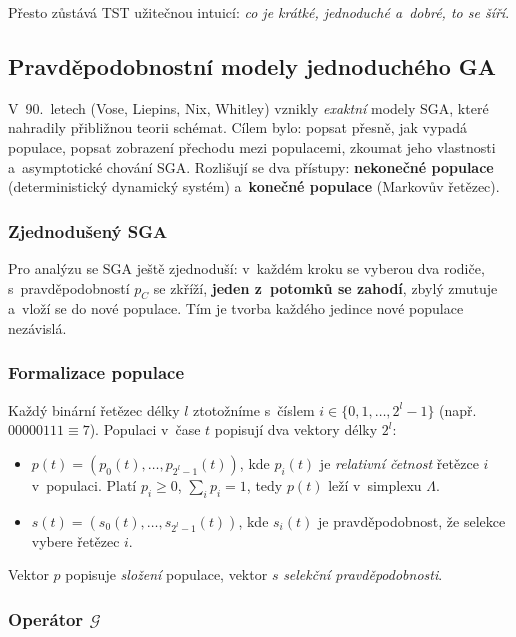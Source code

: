 \documentclass[11pt,a4paper]{article}
\theoremstyle{definition}
\begin{document}
Přesto zůstává TST užitečnou intuicí: \emph{co je krátké, jednoduché a~dobré,
to se šíří}.

\subsection{Pravděpodobnostní modely jednoduchého GA}
\label{sec:vose}


V~90.\ letech (Vose, Liepins, Nix, Whitley) vznikly \emph{exaktní} modely SGA,
které nahradily přibližnou teorii schémat. Cílem bylo:
popsat přesně, jak vypadá populace, popsat zobrazení přechodu mezi populacemi,
zkoumat jeho vlastnosti a~asymptotické chování SGA. Rozlišují se dva přístupy:
\textbf{nekonečné populace} (deterministický dynamický systém) a~\textbf{konečné
populace} (Markovův řetězec).

\subsubsection{Zjednodušený SGA}

Pro analýzu se SGA ještě zjednoduší: v~každém kroku se vyberou dva rodiče,
s~pravděpodobností $p_C$ se zkříží, \textbf{jeden z~potomků se zahodí},
zbylý zmutuje a~vloží se do nové populace. Tím je tvorba každého jedince
nové populace nezávislá.

\subsubsection{Formalizace populace}

Každý binární řetězec délky $l$ ztotožníme s~číslem
$i \in \{0,1,\dots,2^l-1\}$ (např.\ $00000111 \equiv 7$). Populaci v~čase $t$
popisují dva vektory délky $2^l$:

\begin{defbox}
\begin{itemize}
\item $p(t) = (p_0(t),\dots,p_{2^l-1}(t))$, kde $p_i(t)$ je \emph{relativní
  četnost} řetězce $i$ v~populaci. Platí $p_i \ge 0$, $\sum_i p_i = 1$, tedy
  $p(t)$ leží v~simplexu $\Lambda$.
\item $s(t) = (s_0(t),\dots,s_{2^l-1}(t))$, kde $s_i(t)$ je pravděpodobnost,
  že selekce vybere řetězec $i$.
\end{itemize}
Vektor $p$ popisuje \emph{složení} populace, vektor $s$ \emph{selekční
pravděpodobnosti}.
\end{defbox}

\subsubsection{Operátor $\mathcal{G}$}
\end{document}
